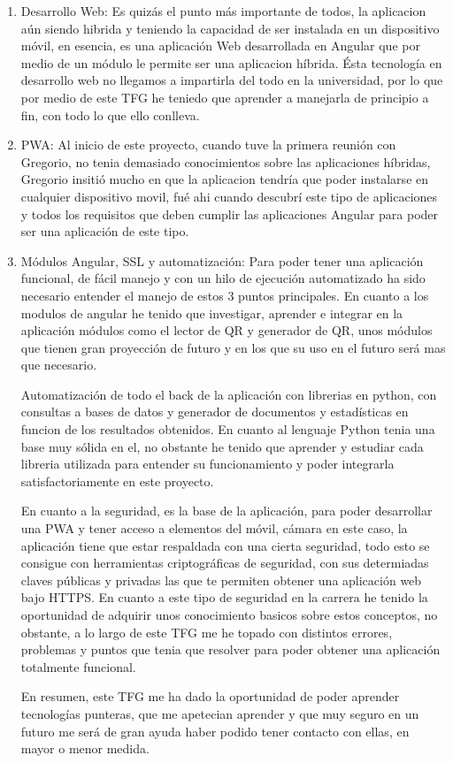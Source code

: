\documentclass[a4paper, 12pt]{book}
\begin{document}
\begin{enumerate}
  \item Desarrollo Web: Es quizás el punto más importante de todos, la aplicacion aún siendo hibrida y teniendo la capacidad de ser instalada en un dispositivo móvil, en esencia, es una aplicación Web desarrollada en Angular que por medio de un módulo le permite ser una aplicacion híbrida. Ésta tecnología en desarrollo web no llegamos a impartirla del todo en la universidad, por lo que por medio de este TFG he teniedo que aprender a manejarla de principio a fin, con todo lo que ello conlleva.
  
  \item PWA: Al inicio de este proyecto, cuando tuve la primera reunión con Gregorio, no tenia demasiado conocimientos sobre las aplicaciones híbridas, Gregorio insitió mucho en que la aplicacion tendría que poder instalarse en cualquier dispositivo movil, fué ahi cuando descubrí este tipo de aplicaciones y todos los requisitos que deben cumplir las aplicaciones Angular para poder ser una aplicación de este tipo.
  
	\item Módulos Angular, SSL y automatización: Para poder tener una aplicación funcional, de fácil manejo y con un hilo de ejecución automatizado ha sido necesario entender el manejo de estos 3 puntos principales. En cuanto a los modulos de angular he tenido que investigar, aprender e integrar en la aplicación módulos como el lector de QR y generador de QR, unos módulos que tienen gran proyección de futuro y en los que su uso en el futuro será mas que necesario.
	
	Automatización de todo el back de la aplicación con librerias en python, con consultas a bases de datos y generador de documentos y estadísticas en funcion de los resultados obtenidos. En cuanto al lenguaje Python tenia una base muy sólida en el, no obstante he tenido que aprender y estudiar cada libreria utilizada para entender su funcionamiento y poder integrarla satisfactoriamente en este proyecto.
	
	En cuanto a la seguridad, es la base de la aplicación, para poder desarrollar una PWA y tener acceso a elementos del móvil, cámara en este caso, la aplicación tiene que estar respaldada con una cierta seguridad, todo esto se consigue con herramientas criptográficas de seguridad, con sus determiadas claves públicas y privadas las que te permiten obtener una aplicación web bajo HTTPS. En cuanto a este tipo de seguridad en la carrera he tenido la oportunidad de adquirir unos conocimiento basicos sobre estos conceptos, no obstante, a lo largo de este TFG me he topado con distintos errores, problemas y puntos que tenia que resolver para poder obtener una  aplicación totalmente funcional.
	
En resumen, este TFG me ha dado la oportunidad de poder aprender tecnologías punteras, que me apetecian aprender y que muy seguro en un futuro me será de gran ayuda haber podido tener contacto con ellas, en mayor o menor medida.
\end{enumerate}
\end{document}
